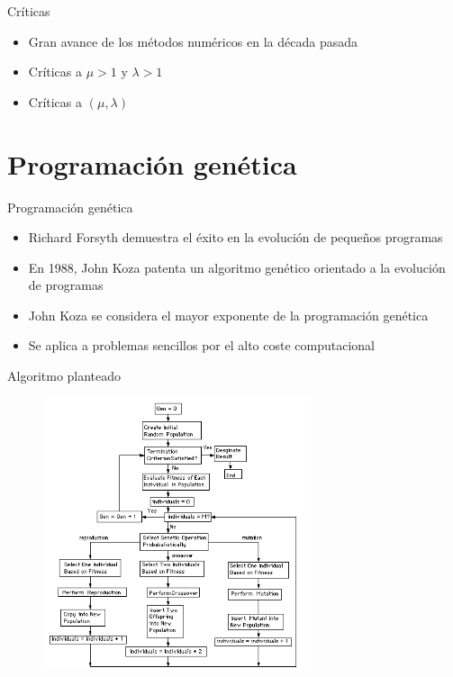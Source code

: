 \documentclass[10pt]{beamer}
\begin{document}
\begin{frame}{Críticas}
  \begin{itemize}\itemsep2pt
  \item Gran avance de los métodos numéricos en la década pasada
  \item Críticas a $\mu > 1$ y $\lambda > 1$
  \item Críticas a $(\mu, \lambda)$
  \end{itemize}
\end{frame}

\section{Programación genética}

\begin{frame}{Programación genética}

 \begin{itemize}\itemsep2pt
  \item Richard Forsyth demuestra el éxito en la evolución de pequeños programas
  \item En 1988, John Koza patenta un algoritmo genético orientado a la evolución de programas
  \item John Koza se considera el mayor exponente de la programación genética
  \item Se aplica a problemas sencillos por el alto coste computacional
  \end{itemize}
  
\end{frame}

\begin{frame}{Algoritmo planteado}

 \begin{figure}[H]
  \centering
  \includegraphics[width=0.7\textwidth]{imgs/FlowchartGP.PNG}
  \label{fig:dfd:1}
\end{figure}
  
\end{frame}
\end{document}
